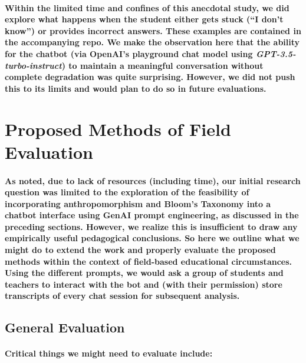 \documentclass{article}
\begin{document}
\paragraph{Within the limited time and confines of this anecdotal study, we did explore what happens when the student either gets stuck (“I don’t know”) or provides incorrect answers. These examples are contained in the accompanying repo. We make the observation here that the ability for the chatbot (via OpenAI’s playground chat model using \textit{GPT-3.5-turbo-instruct}) to maintain a meaningful conversation without complete degradation was quite surprising. However, we did not push this to its limits and would plan to do so in future evaluations.}

\newpage

\section*{Proposed Methods of Field Evaluation}

\paragraph{As noted, due to lack of resources (including time), our initial research question was limited to the exploration of the feasibility of incorporating anthropomorphism and Bloom’s Taxonomy into a chatbot interface using GenAI prompt engineering, as discussed in the preceding sections. However, we realize this is insufficient to draw any empirically useful pedagogical conclusions. So here we outline what we might do to extend the work and properly evaluate the proposed methods within the context of field-based educational circumstances. Using the different prompts, we would ask a group of students and teachers to interact with the bot and (with their permission) store transcripts of every chat session for subsequent analysis.}

\subsection*{General Evaluation}

\paragraph{Critical things we might need to evaluate include:}
\end{document}
